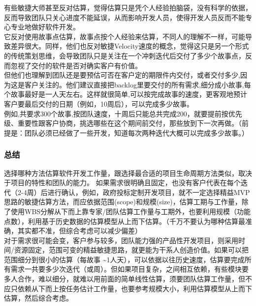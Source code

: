 \begin{description}
\item[]
\begin{description}
\tightlist
\item[]
+ + +
\end{description}
\end{description}

有些敏捷大师甚至反对估算，觉得估算只是凭个人经验拍脑袋，没有科学的依据，反而导致团队只关心进度不能延误，从而影响开发人员，使得开发人员反而不能专心专业地做好软件开发。\\
它反对使用故事点估算，故事点按个人经验来估算，不同人的理解不一样，可能导致差异很大。同样，他们也反对敏捷Velocity速度的概念，觉得这只是另一个形式的传统策划思维，会导致团队只是关注在一个冲刺迭代后交付了多少个故事点，反而忽视了交付的软件是否对确实客户有价值。\\
但他们也理解到团队还是要预估可否在客户定的期限件内交付，或者交付多少,因为这是客户关注的。他们建议直接把backlog里要交付的所有需求,细分成小故事,每个故事最好是一人天左右。这样就很简单,可以按完成故事的速度，更客观地预计客户要最后交付的日期（例如，10周后），可以完成多少故事。\\
例如,共要求300个故事,按团队速度，十周后只能总共完成200，就要提前按优先级、重要性跟客户协商，挑选哪些在这个期间前交付，那些放到下一次再做。（前提是：团队必须已经做了一些开发，知道每次两种迭代大概可以完成多少故事。）\\

\hypertarget{ux603bux7ed3}{%
\subsubsection{总结}\label{ux603bux7ed3}}

选择哪种方法估算软件开发工作量，跟选择最合适的项目生命周期方法类似，取决于项目的特性和团队的能力。
如果需求很明确且固定，也没有客户代表在每个迭代（2-4周）后进行确认，例如，政府投标定制开发项目，就不一定选择精益MVP思路的敏捷估算方法，而应依据范围(scope)和规模(size)，估算工期与工作量，除了使用WBS分解从下而上靠专家/团队估算工作量与工期外，也要利用规模（功能点数），利用基于历史数据的估算模型从上而下估算。（千万不要认为哪种估算最准确，其实都不准，但综合考虑可以减少偏差）\\
对于需求很可能会变，客户参与较多，团队能力强的产品性开发项目，则采用时间/资源固定，范围可变的精益敏捷思路，就更能为干系人创造价值。如果可以把范围细分到很小的估算（每故事
\textasciitilde{}1人天），可以依据以往历史速度，估算要完成所有需求一共要多少次迭代（或周）。但如果项目复杂，之间相互依赖，有些模块要多人合作，难以细分，就难以用前面的简单线性估算，须要团队估算工作量，但不应只依赖从下而上按任务估计工作量，也要参考规模大小，利用估算模型从上而下估算，然后综合考虑。

